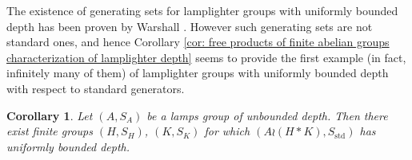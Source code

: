 \documentclass[reqno,oneside]{amsart}
\newcommand{\std}{S_{\mathrm{std}}}
\theoremstyle{plain}
\newtheorem{cor}[thm]{Corollary}
\theoremstyle{definition}
\begin{document}
The existence of generating sets for lamplighter groups with uniformly bounded depth has been proven by Warshall \cite{warshall2008strongly}. However such generating sets are not standard ones, and hence Corollary \ref{cor: free products of finite abelian groups characterization of lamplighter depth} seems to provide the first example (in fact, infinitely many of them) of lamplighter groups with uniformly bounded depth with respect to standard generators.
\begin{cor}\label{cor: there exist a lamplighter group with uniformly bounded depth with respect to std gensets}
	Let $(A,S_A)$ be a lamps group of unbounded depth. Then there exist finite groups $(H,S_H)$, $(K,S_K)$ for which $(A\wr (H*K),\std)$ has uniformly bounded depth.
\end{cor}





\end{document}
